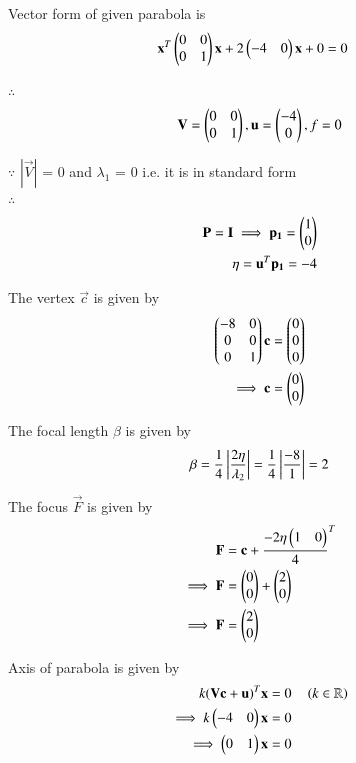 \documentclass[journal,12pt,twocolumn]{IEEEtran}
\begin{document}
Vector form of given parabola is
\begin{align}
\mathbf{x}^T\begin{pmatrix}0 & 0 \\ 0 & 1\end{pmatrix}\mathbf{x} + 2\begin{pmatrix}-4 & 0\end{pmatrix}\mathbf{x} + 0 &= 0 
\end{align}

$\therefore$
\begin{align}
 \mathbf{V} = \begin{pmatrix}0 & 0 \\ 0 & 1\end{pmatrix} ,
 \mathbf{u} = \begin{pmatrix}-4\\0\end{pmatrix} ,
 f = 0
\end{align}

$\because$
$|\vec{V}|$ = 0 and $\lambda_1$ = 0 i.e. it is in standard form
\\
$\therefore$
\begin{align}
\mathbf{P}=\mathbf{I} \implies \mathbf{p_1} = \begin{pmatrix}1\\0\end{pmatrix}
\\
\eta = \mathbf{u}^T\mathbf{p_1} = -4
\end{align}

The vertex $\vec{c}$ is given by
\begin{align}
\begin{pmatrix}-8 & 0\\0 & 0\\0 & 1\end{pmatrix}\mathbf{c} &= \begin{pmatrix}0\\0\\0\end{pmatrix}
\\
\implies \mathbf{c} &= \begin{pmatrix}0\\0\end{pmatrix}
\end{align}

The focal length $\beta$ is given by
\begin{align}
\beta = \frac{1}{4}\left\vert\frac{2\eta}{\lambda_2}\right\vert = \frac{1}{4}\left\vert\frac{-8}{1}\right\vert= 2
\end{align}

The focus $\vec{F}$ is given by
\begin{align}
\mathbf{F} &= \mathbf{c} + {\frac{-2\eta\begin{pmatrix}1 & 0\end{pmatrix}}{4}}^{T} 
\\
\implies \mathbf{F} &= \begin{pmatrix}0\\0\end{pmatrix} + \begin{pmatrix}2\\0\end{pmatrix}
\\
\implies \mathbf{F} &= \begin{pmatrix}2\\0\end{pmatrix}
\end{align}

Axis of parabola is given by
\begin{align}
k(\mathbf{V}\mathbf{c}+\mathbf{u})^{T}\mathbf{x} &= 0 \quad\left(  k \in \mathbb{R}\right)
\\
\implies k\begin{pmatrix}-4 & 0\end{pmatrix}\mathbf{x} &= 0
\\
\implies \begin{pmatrix}0 & 1\end{pmatrix}\mathbf{x} &= 0
\end{align}
\end{document}
